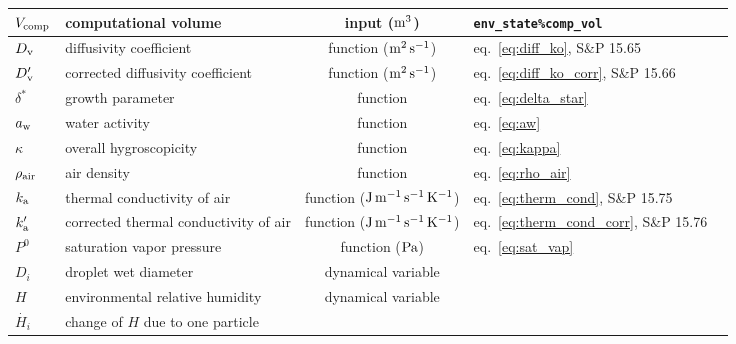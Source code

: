 \documentclass{article}
\begin{document}
\begin{tabular}{lp{4cm}clp{3cm}}
$V_{\rm comp}$ & computational volume & input ($\rm m^3$) & \verb+env_state%comp_vol+\\
\hline
$D_{\rm v}$     & diffusivity coefficient  &  function ($\rm m^2\, s^{-1}$) & eq.~\ref{eq:diff_ko}, S\&P 15.65  \\
$D_{\rm v}'$     & corrected diffusivity coefficient   &  function ($\rm m^2\, s^{-1}$) & eq.~\ref{eq:diff_ko_corr}, S\&P 15.66  \\
$\delta^*$  & growth parameter & function & eq.~\ref{eq:delta_star}\\
$a_{\rm w}$  & water activity  & function & eq.~\ref{eq:aw}   \\
$\kappa$      &  overall hygroscopicity   &  function &  eq.~\ref{eq:kappa}  \\
$\rho_{\rm air}$    &  air density   &  function &  eq.~\ref{eq:rho_air}  \\
$k_{\rm a}$     & thermal conductivity of air   &  function ($\rm J\,m^{-1}\, s^{-1} \, K^{-1}$) &  eq.~\ref{eq:therm_cond}, S\&P 15.75   \\
$k_{\rm a}'$    & corrected thermal conductivity of air   &  function ($\rm J\,m^{-1}\, s^{-1} \, K^{-1}$) &  eq.~\ref{eq:therm_cond_corr}, S\&P 15.76   \\
$P^0$   & saturation vapor pressure &  function ($\rm Pa$) & eq.~\ref{eq:sat_vap}  \\
$D_i$     &  droplet wet diameter  & dynamical variable  &     \\
$H$     &  environmental relative humidity  &  dynamical variable &  \\
$\dot{H_i}$    & change of $H$ due to one particle & & \\
\hline 
\end{tabular}
\end{document}
